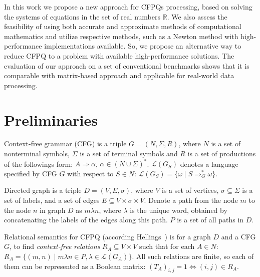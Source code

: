\documentclass[sigconf]{acmart}
\begin{document}
In this work we propose a new approach for CFPQs processing, based on solving the systems of equations in the set of real numbers $\mathbb{R}$.
We also assess the feasibility of using both accurate and approximate methods of computational mathematics and utilize respective methods, such as a Newton method with high-performance implementations available.
So, we propose an alternative way to reduce CFPQ to a problem with available high-performance solutions.
The evaluation of our approach on a set of conventional benchmarks shows that it is comparable with matrix-based approach and applicable for real-world data processing.

\section{Preliminaries}

Context-free grammar (CFG) is a triple $G=(N, \Sigma, R)$, where $N$ is a set of nonterminal symbols, $\Sigma$ is a set of terminal symbols and $R$ is a set of productions of the followings form: $A \Rightarrow \alpha$, $\alpha \in (N \cup \Sigma)^*$. 
$\mathcal{L}(G_S)$ denotes a language specified by CFG $G$ with respect to $S \in N$: $\mathcal{L}(G_S) = \{\omega \mid S \Rightarrow_{G}^{*} \omega\}$.

Directed graph is a triple $D = (V,E,\sigma)$, where $V$ is a set of vertices, $\sigma \subseteq \Sigma$ is a set of labels, and a set of edges $E\subseteq V\times \sigma \times V$. 
Denote a path from the node $m$ to the node $n$ in graph $D$ as $m\lambda n$, where
$\lambda$ is the unique word, obtained by concatenating the labels of the edges along this path.
$P$ is a set of all paths in $D$.

Relational semantics for CFPQ (according Hellings~\cite{hellings2014conjunctive}) is for a graph $D$ and a CFG $G$, to find \emph{context-free relations} $R_A \subseteq V \times V$ such that for each $A \in N$: $R_A = \{(m, n) \mid m\lambda n \in P, \lambda \in \mathcal{L}(G_A)\}.$
All such relations are finite, so each of them can be represented as a Boolean matrix: $(T_A)_{i,j} = 1 \iff (i,j) \in R_A$. 

\end{document}
